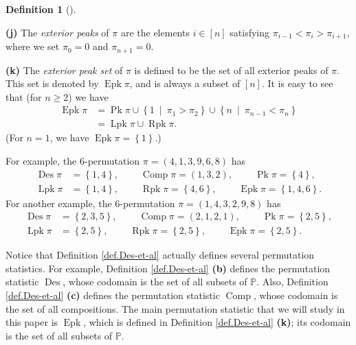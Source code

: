 \documentclass[numbers=enddot,12pt,final,onecolumn,notitlepage]{scrartcl}%
\theoremstyle{definition}
\newtheorem{defi}[theo]{Definition}
\newenvironment{definition}[1][]
{\begin{defi}[#1]\begin{leftbar}}
{\end{leftbar}\end{defi}}
\begin{document}
\begin{definition}
\textbf{(j)} The \textit{exterior peaks} of $\pi$ are the elements
$i\in\left[  n\right]  $ satisfying $\pi_{i-1}<\pi_{i}>\pi_{i+1}$, where we
set $\pi_{0}=0$ and $\pi_{n+1}=0$.

\textbf{(k)} The \textit{exterior peak set} of $\pi$ is defined to be the set
of all exterior peaks of $\pi$. This set is denoted by $\operatorname*{Epk}%
\pi$, and is always a subset of $\left[  n\right]  $. It is easy to see that
(for $n\geq2$) we have%
\begin{align*}
\operatorname*{Epk}\pi &  =\operatorname*{Pk}\pi\cup\left\{  1\ \mid\ \pi
_{1}>\pi_{2}\right\}  \cup\left\{  n\ \mid\ \pi_{n-1}<\pi_{n}\right\} \\
&  =\operatorname*{Lpk}\pi\cup\operatorname*{Rpk}\pi.
\end{align*}
(For $n=1$, we have $\operatorname*{Epk}\pi=\left\{  1\right\}  $.)
\end{definition}

For example, the $6$-permutation $\pi=\left(  4,1,3,9,6,8\right)  $ has%
\begin{align*}
\operatorname*{Des}\pi &  =\left\{  1,4\right\}
,\ \ \ \ \ \ \ \ \ \ \operatorname*{Comp}\pi=\left(  1,3,2\right)
,\ \ \ \ \ \ \ \ \ \ \operatorname*{Pk}\pi=\left\{  4\right\}  ,\\
\operatorname*{Lpk}\pi &  =\left\{  1,4\right\}
,\ \ \ \ \ \ \ \ \ \ \operatorname*{Rpk}\pi=\left\{  4,6\right\}
,\ \ \ \ \ \ \ \ \ \ \operatorname*{Epk}\pi=\left\{  1,4,6\right\}  .
\end{align*}
For another example, the $6$-permutation $\pi=\left(  1,4,3,2,9,8\right)  $
has%
\begin{align*}
\operatorname*{Des}\pi &  =\left\{  2,3,5\right\}
,\ \ \ \ \ \ \ \ \ \ \operatorname*{Comp}\pi=\left(  2,1,2,1\right)
,\ \ \ \ \ \ \ \ \ \ \operatorname*{Pk}\pi=\left\{  2,5\right\}  ,\\
\operatorname*{Lpk}\pi &  =\left\{  2,5\right\}
,\ \ \ \ \ \ \ \ \ \ \operatorname*{Rpk}\pi=\left\{  2,5\right\}
,\ \ \ \ \ \ \ \ \ \ \operatorname*{Epk}\pi=\left\{  2,5\right\}  .
\end{align*}


Notice that Definition \ref{def.Des-et-al} actually defines several
permutation statistics. For example, Definition \ref{def.Des-et-al}
\textbf{(b)} defines the permutation statistic $\operatorname*{Des}$, whose
codomain is the set of all subsets of $\mathbb{P}$. Also, Definition
\ref{def.Des-et-al} \textbf{(c)} defines the permutation statistic
$\operatorname*{Comp}$, whose codomain is the set of all compositions. The
main permutation statistic that we will study in this paper is
$\operatorname*{Epk}$, which is defined in Definition \ref{def.Des-et-al}
\textbf{(k)}; its codomain is the set of all subsets of $\mathbb{P}$.
\end{document}
